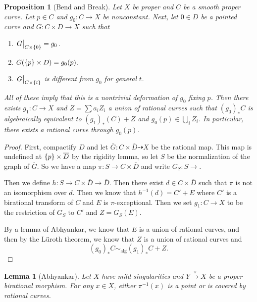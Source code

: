 \documentclass[leqno, openany]{memoir}
\newtheorem{prop}[thm]{Proposition}
\newtheorem{lem}[thm]{Lemma}
\theoremstyle{definition}
\theoremstyle{remark}
\theoremstyle{plain}
\theoremstyle{definition}
\theoremstyle{remark}
\newcommand{\mr}[1]{\mathrm{#1}}
\newcommand{\ol}[1]{\overline{#1}}
\begin{document}
\begin{prop}[Bend and Break]
    Let $X$ be proper and $C$ be a smooth proper curve. Let $p \in C$ and $g_0 \colon C \to X$ be nonconstant. Next, let $0 \in D$ be a pointed curve and $G \colon C \times D \to X$ such that
    \begin{enumerate}
        \item $\eval{G}_{C \times \qty{0}} = g_0$.
        \item $G(\qty{p} \times D) = g_0(p)$.
        \item $\eval{G}_{C \times \qty{t}}$ is different from $g_0$ for general $t$.
    \end{enumerate}
    All of these imply that this is a nontrivial deformation of $g_0$ fixing $p$. Then there exists $g_1 \colon C \to X$ and $Z = \sum a_i Z_i$ a union of rational curves such that ${(g_0)}_* C$ is algebraically equivalent to ${(g_1)}_* (C) + Z$ and $g_0(p) \in \bigcup_i Z_i$. In particular, there exists a rational curve through $g_0(p)$.
\end{prop}

\begin{proof}
    First, compactify $D$ and let $\ol{G} \colon C \times \ol{D} \dashrightarrow X$ be the rational map. This map is undefined at $\qty{p} \times \ol{D}$ by the rigidity lemma, so let $S$ be the normalization of the graph of $\ol{G}$. So we have a map $\pi \colon S \to C \times \ol{D}$ and write $G_S \colon S \to $. 

    Then we define $h \colon S \to C \times \ol{D} \to \ol{D}$. Then there exist $d \in C \times \ol{D}$ such that $\pi$ is not an isomorphism over $d$. Then we know that $h^{-1}(d) = C' + E$ where $C'$ is a birational transform of $C$ and $E$ is $\pi$-exceptional. Then we set $g_1 \colon C \to X$ to be the restriction of $G_S$ to $C'$ and $Z = G_S(E)$.

    By a lemma of Abhyankar, we know that $E$ is a union of rational curves, and then by the L\"uroth theorem, we know that $Z$ is a union of rational curves and
    \[ {(g_0)}_* C \sim_{\mr{alg}} {(g_1)}_* C + Z. \]
\end{proof}

\begin{lem}[Abhyankar]
    Let $X$ have mild singularities and $Y \xrightarrow{\pi} X$ be a proper birational morphism. For any $x \in X$, either $\pi^{-1}(x)$ is a point or is covered by rational curves.
\end{lem}
\end{document}
